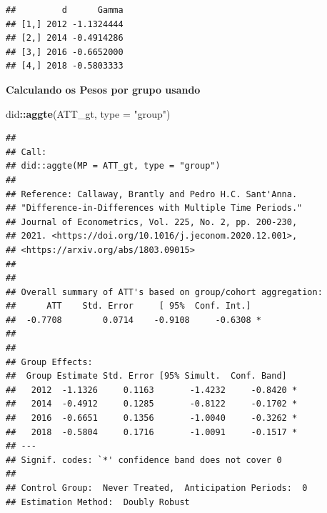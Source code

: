 \documentclass[portugues]{article}
\newenvironment{Shaded}{\begin{snugshade}}{\end{snugshade}}
\newcommand{\AttributeTok}[1]{\textcolor[rgb]{0.13,0.29,0.53}{#1}}
\newcommand{\CommentTok}[1]{\textcolor[rgb]{0.56,0.35,0.01}{\textit{#1}}}
\newcommand{\FunctionTok}[1]{\textcolor[rgb]{0.13,0.29,0.53}{\textbf{#1}}}
\newcommand{\NormalTok}[1]{#1}
\newcommand{\OtherTok}[1]{\textcolor[rgb]{0.56,0.35,0.01}{#1}}
\newcommand{\SpecialCharTok}[1]{\textcolor[rgb]{0.81,0.36,0.00}{\textbf{#1}}}
\newcommand{\StringTok}[1]{\textcolor[rgb]{0.31,0.60,0.02}{#1}}
\begin{document}
\begin{box_code}
\begin{Shaded}
\end{Shaded}

\begin{verbatim}
##         d      Gamma
## [1,] 2012 -1.1324444
## [2,] 2014 -0.4914286
## [3,] 2016 -0.6652000
## [4,] 2018 -0.5803333
\end{verbatim}

\noindent \textbf{Calculando os Pesos por grupo usando \cite{callaway2021difference}}

\begin{Shaded}
\begin{Highlighting}[]
\NormalTok{did}\SpecialCharTok{::}\FunctionTok{aggte}\NormalTok{(ATT\_gt, }\AttributeTok{type =} \StringTok{"group"}\NormalTok{)}
\end{Highlighting}
\end{Shaded}

\begin{verbatim}
## 
## Call:
## did::aggte(MP = ATT_gt, type = "group")
## 
## Reference: Callaway, Brantly and Pedro H.C. Sant'Anna.  
## "Difference-in-Differences with Multiple Time Periods." 
## Journal of Econometrics, Vol. 225, No. 2, pp. 200-230, 
## 2021. <https://doi.org/10.1016/j.jeconom.2020.12.001>, 
## <https://arxiv.org/abs/1803.09015> 
## 
## 
## Overall summary of ATT's based on group/cohort aggregation:  
##      ATT    Std. Error     [ 95%  Conf. Int.]  
##  -0.7708        0.0714    -0.9108     -0.6308 *
## 
## 
## Group Effects:
##  Group Estimate Std. Error [95% Simult.  Conf. Band]
##   2012  -1.1326     0.1163       -1.4232     -0.8420 *
##   2014  -0.4912     0.1285       -0.8122     -0.1702 *
##   2016  -0.6651     0.1356       -1.0040     -0.3262 *
##   2018  -0.5804     0.1716       -1.0091     -0.1517 *
## ---
## Signif. codes: `*' confidence band does not cover 0
## 
## Control Group:  Never Treated,  Anticipation Periods:  0
## Estimation Method:  Doubly Robust
\end{verbatim}

\end{box_code}
\end{document}
